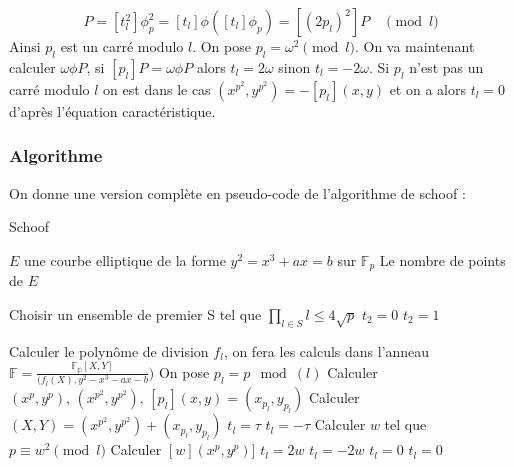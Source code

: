 \documentclass{article}
\begin{document}
\begin{equation}
[t_l^2 p_l]P = [t_l^2] \phi_p^2 = [t_l] \phi ([t_l] \phi_p) = [(2p_l)^2]P \quad \pmod{l}
\end{equation}
Ainsi $p_l$ est un carré modulo $l$. On pose $p_l = \omega^2 \pmod{l}$. On va maintenant calculer $\omega \phi P$, si $[p_l]P = \omega \phi P$ alors $t_l = 2\omega$ sinon $t_l = -2\omega$.
\newline
\medskip
Si $p_l$ n'est pas un carré modulo $l$ on est dans le cas $(x^{p^2}, y^{p^2}) = - [p_l](x,y)$ et on a alors $t_l = 0$ d'après l'équation caractéristique. 

\newpage
\subsubsection{Algorithme}
On donne une version complète en pseudo-code de l'algorithme de schoof : 

\begin{algorithm}
\caption{Schoof}
\begin{algorithmic}
\REQUIRE $E$ une courbe elliptique de la forme $y^2 = x^3 + ax = b$ sur $\mathbb{F}_p$
\ENSURE Le nombre de points de $E$

\STATE Choisir un ensemble de premier S tel que $\prod_{l \in S}l \leq 4\sqrt{p}$
\STATE $t_2 = 0$
\ELSE
\STATE $t_2 = 1$
\ENDIF

\STATE Calculer le polynôme de division $f_l$, on fera les calculs dans l'anneau $\mathbb{F}= \frac{\mathbb{F_p}[X,Y]}{(f_l(X), y^2 -x^3 - ax - b})$
\STATE On pose $p_l = p \mod(l)$
\STATE Calculer $(x^p, y^p), \, (x^{p^2}, y^{p^2}), \, [p_l](x, y) = (x_{p_l}, y_{p_l})$
\STATE Calculer $(X, Y) = (x^{p^2}, y^{p^2}) + (x_{p_l}, y_{p_l})$
\STATE $t_l = \tau$
\ELSE 
\STATE $t_l = - \tau$
\ENDIF
\ENDIF
\ENDFOR
\ELSE
{}
\STATE Calculer $w$ tel que $p \equiv w^2 \pmod l$ 
\STATE Calculer $[w](x^p,y^p)]$
\IF{$[w](x^p,y^p)] = (x^{p^2}, y^{p^2})$}
\STATE $t_l = 2w$
\ENDIF
\IF{$[w](x^p,y^p)] = (x^{p^2}, -y^{p^2})$}
\STATE $t_l = -2w$
\ELSE
\STATE $t_l =0$
\ENDIF
\ELSE
\STATE $t_l = 0$

\ENDIF
\ENDIF
\ENDFOR
\end{algorithmic}
\end{algorithm}
\end{document}
